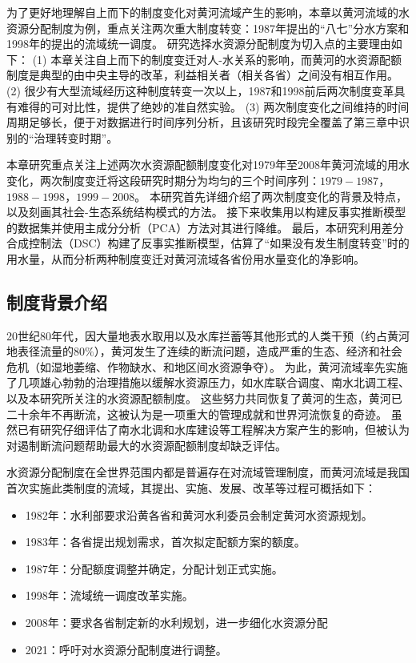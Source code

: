 
为了更好地理解自上而下的制度变化对黄河流域产生的影响，本章以黄河流域的水资源分配制度为例，重点关注两次重大制度转变：1987年提出的“八七”分水方案和1998年的提出的流域统一调度。
研究选择水资源分配制度为切入点的主要理由如下：
(1) 本章关注自上而下的制度变迁对人-水关系的影响，而黄河的水资源配额制度是典型的由中央主导的改革，利益相关者（相关各省）之间没有相互作用。
(2) 很少有大型流域经历这种制度转变一次以上，1987和1998前后两次制度变革具有难得的可对比性，提供了绝妙的准自然实验。
(3) 两次制度变化之间维持的时间周期足够长，便于对数据进行时间序列分析，且该研究时段完全覆盖了第三章中识别的“治理转变时期”。

本章研究重点关注上述两次水资源配额制度变化对1979年至2008年黄河流域的用水变化，两次制度变迁将这段研究时期分为均匀的三个时间序列：$1979-1987$，$1988-1998$，$1999-2008$。
本研究首先详细介绍了两次制度变化的背景及特点，以及刻画其社会-生态系统结构模式的方法。
接下来收集用以构建反事实推断模型的数据集并使用主成分分析（PCA）方法对其进行降维。
最后，本研究利用差分合成控制法（DSC）构建了反事实推断模型\cite{arkhangelsky2021}，估算了“如果没有发生制度转变”时的用水量，从而分析两种制度变迁对黄河流域各省份用水量变化的净影响。

\subsection{制度背景介绍}\label{sec:yrb}

20世纪80年代，因大量地表水取用以及水库拦蓄等其他形式的人类干预（约占黄河地表径流量的$80\%$），黄河发生了连续的断流问题，造成严重的生态、经济和社会危机（如湿地萎缩、作物缺水、和地区间水资源争夺）。
为此，黄河流域率先实施了几项雄心勃勃的治理措施以缓解水资源压力，如水库联合调度、南水北调工程、以及本研究所关注的水资源配额制度\cite{long2020, wang2019d}。
这些努力共同恢复了黄河的生态，黄河已二十余年不再断流，这被认为是一项重大的管理成就和世界河流恢复的奇迹。
虽然已有研究仔细评估了南水北调和水库建设等工程解决方案产生的影响\cite{long2020,wang2019c}，但被认为对遏制断流问题帮助最大的水资源配额制度却缺乏评估\cite{wang2019b}。

水资源分配制度在全世界范围内都是普遍存在对流域管理制度，而黄河流域是我国首次实施此类制度的流域，其提出、实施、发展、改革等过程可概括如下\cite{wang2019b}：%
\begin{itemize}
    \item 1982年：水利部要求沿黄各省和黄河水利委员会制定黄河水资源规划\cite{wang2019, wang2019a}。
    \item 1983年：各省提出规划需求，首次拟定配额方案的额度。
    \item 1987年：分配额度调整并确定，分配计划正式实施。
    \item 1998年：流域统一调度改革实施。
    \item 2008年：要求各省制定新的水利规划，进一步细化水资源分配\cite{wang2019,wang2019a}
    \item 2021：呼吁对水资源分配制度进行调整。
\end{itemize}

